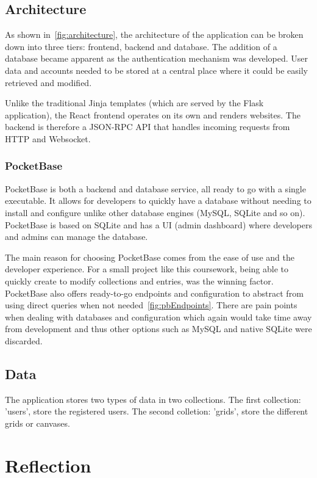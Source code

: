 \subsection{Architecture}\label{subsec:architecture}



As shown in~\ref{fig:architecture}, the architecture of the application can be broken down into three tiers: frontend, backend and database.
The addition of a database became apparent as the authentication mechanism was developed.
User data and accounts needed to be stored at a central place where it could be easily retrieved and modified.

Unlike the traditional Jinja templates (which are served by the Flask application), the React frontend operates on its own and renders websites.
The backend is therefore a JSON-RPC API that handles incoming requests from HTTP and Websocket.

\subsubsection{PocketBase}
PocketBase is both a backend and database service, all ready to go with a single executable.
It allows for developers to quickly have a database without needing to install and configure unlike other database engines (MySQL, SQLite and so on).
PocketBase is based on SQLite and has a UI (admin dashboard) where developers and admins can manage the database.

The main reason for choosing PocketBase comes from the ease of use and the developer experience.
For a small project like this coursework, being able to quickly create to modify collections and entries, was the winning factor.
PocketBase also offers ready-to-go endpoints and configuration to abstract from using direct queries when not needed~\ref{fig:pbEndpoints}.
There are pain points when dealing with databases and configuration which again would take time away from development and thus other options such as MySQL and native SQLite were discarded.

\subsection{Data}\label{subsec:data}
The application stores two types of data in two collections.
The first collection: 'users', store the registered users.
The second colletion: 'grids', store the different grids or canvases.


\section{Reflection}\label{sec:reflection}

